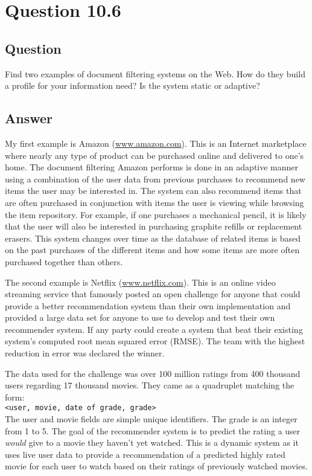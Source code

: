 \section{Question 10.6}

\subsection{Question}
Find two examples of document filtering systems on the Web. How do they build a profile for your information need? Is the system static or adaptive?

\subsection{Answer}
My first example is Amazon (\url{www.amazon.com}).  This is an Internet marketplace where nearly any type of product can be purchased online and delivered to one's home.  The document filtering Amazon performs is done in an adaptive manner using a combination of the user data from previous purchases to recommend new items the user may be interested in.  The system can also recommend items that are often purchased in conjunction with items the user is viewing while browsing the item repository.  For example, if one purchases a mechanical pencil, it is likely that the user will also be interested in purchasing graphite refills or replacement erasers.  This system changes over time as the database of related items is based on the past purchases of the different items and how some items are more often purchased together than others.

The second example is Netflix (\url{www.netflix.com}).  This is an online video streaming service that famously posted an open challenge for anyone that could provide a better recommendation system than their own implementation and provided a large data set for anyone to use to develop and test their own recommender system.  If any party could create a system that beat their existing system's computed root mean squared error (RMSE).  The team with the highest reduction in error was declared the winner.

The data used for the challenge was over 100 million ratings from 400 thousand users regarding 17 thousand movies.  They came as a quadruplet matching the form:\\

\texttt{<user, movie, date of grade, grade>}\\

The user and movie fields are simple unique identifiers.  The grade is an integer from 1 to 5.  The goal of the recommender system is to predict the rating a user \textit{would} give to a movie they haven't yet watched.  This is a dynamic system as it uses live user data to provide a recommendation of a predicted highly rated movie for each user to watch based on their ratings of previously watched movies.